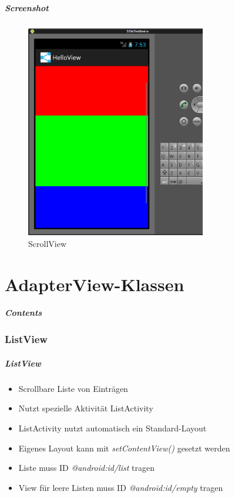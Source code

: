 \begin{frame}
   \frametitle{Screenshot}
   \begin{figure}[h!]
     \centering
     \includegraphics[width=0.7\textwidth]{pictures/scrollview.ps}
     \caption{
        ScrollView
     }
     \label{fig:scrollview}
   \end{figure}
\end{frame}

\part{AdapterView-Klassen}
\frame{\partpage}
\begin{frame}
	\frametitle{Contents}
	\tableofcontents[]
\end{frame}

\section{ListView}
\begin{frame}[label=listview]
   \frametitle{ListView}
   \begin{itemize}
      \item Scrollbare Liste von Einträgen
      \item Nutzt spezielle Aktivität ListActivity
      \item ListActivity nutzt automatisch ein Standard-Layout
      \item Eigenes Layout kann mit \emph{setContentView()} gesetzt werden
      \item Liste muss ID \emph{@android:id/list} tragen
      \item View für leere Listen muss ID \emph{@android:id/empty} tragen
   \end{itemize}
   
   
\end{frame}

